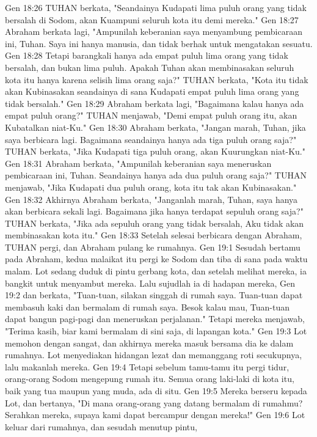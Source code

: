Gen 18:26  TUHAN berkata, "Seandainya Kudapati lima puluh orang yang tidak bersalah di Sodom, akan Kuampuni seluruh kota itu demi mereka."
Gen 18:27  Abraham berkata lagi, "Ampunilah keberanian saya menyambung pembicaraan ini, Tuhan. Saya ini hanya manusia, dan tidak berhak untuk mengatakan sesuatu.
Gen 18:28  Tetapi barangkali hanya ada empat puluh lima orang yang tidak bersalah, dan bukan lima puluh. Apakah Tuhan akan membinasakan seluruh kota itu hanya karena selisih lima orang saja?" TUHAN berkata, "Kota itu tidak akan Kubinasakan seandainya di sana Kudapati empat puluh lima orang yang tidak bersalah."
Gen 18:29  Abraham berkata lagi, "Bagaimana kalau hanya ada empat puluh orang?" TUHAN menjawab, "Demi empat puluh orang itu, akan Kubatalkan niat-Ku."
Gen 18:30  Abraham berkata, "Jangan marah, Tuhan, jika saya berbicara lagi. Bagaimana seandainya hanya ada tiga puluh orang saja?" TUHAN berkata, "Jika Kudapati tiga puluh orang, akan Kuurungkan niat-Ku."
Gen 18:31  Abraham berkata, "Ampunilah keberanian saya meneruskan pembicaraan ini, Tuhan. Seandainya hanya ada dua puluh orang saja?" TUHAN menjawab, "Jika Kudapati dua puluh orang, kota itu tak akan Kubinasakan."
Gen 18:32  Akhirnya Abraham berkata, "Janganlah marah, Tuhan, saya hanya akan berbicara sekali lagi. Bagaimana jika hanya terdapat sepuluh orang saja?" TUHAN berkata, "Jika ada sepuluh orang yang tidak bersalah, Aku tidak akan membinasakan kota itu."
Gen 18:33  Setelah selesai berbicara dengan Abraham, TUHAN pergi, dan Abraham pulang ke rumahnya.
Gen 19:1  Sesudah bertamu pada Abraham, kedua malaikat itu pergi ke Sodom dan tiba di sana pada waktu malam. Lot sedang duduk di pintu gerbang kota, dan setelah melihat mereka, ia bangkit untuk menyambut mereka. Lalu sujudlah ia di hadapan mereka,
Gen 19:2  dan berkata, "Tuan-tuan, silakan singgah di rumah saya. Tuan-tuan dapat membasuh kaki dan bermalam di rumah saya. Besok kalau mau, Tuan-tuan dapat bangun pagi-pagi dan meneruskan perjalanan." Tetapi mereka menjawab, "Terima kasih, biar kami bermalam di sini saja, di lapangan kota."
Gen 19:3  Lot memohon dengan sangat, dan akhirnya mereka masuk bersama dia ke dalam rumahnya. Lot menyediakan hidangan lezat dan memanggang roti secukupnya, lalu makanlah mereka.
Gen 19:4  Tetapi sebelum tamu-tamu itu pergi tidur, orang-orang Sodom mengepung rumah itu. Semua orang laki-laki di kota itu, baik yang tua maupun yang muda, ada di situ.
Gen 19:5  Mereka berseru kepada Lot, dan bertanya, "Di mana orang-orang yang datang bermalam di rumahmu? Serahkan mereka, supaya kami dapat bercampur dengan mereka!"
Gen 19:6  Lot keluar dari rumahnya, dan sesudah menutup pintu,

